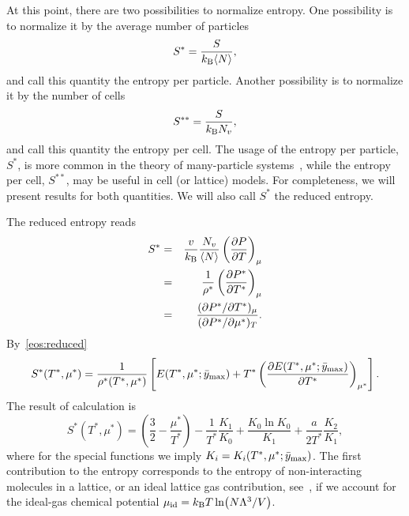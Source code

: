 \documentclass[12pt]{article}
\numberwithin{equation}{section}
\begin{document}
	At this point, there are two possibilities to normalize entropy. One possibility is to normalize it by the average number of particles
	\begin{equation}
		S^{*} = \frac{S}{k_{\rm B} \langle N \rangle},
	\end{equation}
	and call this quantity the entropy per particle. Another possibility is to normalize it by the number of cells
	\begin{equation}
		S^{**} = \frac{S}{k_{\rm B}N_v},
	\end{equation}
	and call this quantity the entropy per cell. The usage of the entropy per particle, $S^*$, is more common in the theory of many-particle systems~\cite{HansenMcDonald13}, while the entropy per cell, $S^{**}$, may be useful in cell (or lattice) models. For completeness, we will present results for both quantities. We will also call $S^*$ the reduced entropy.
	
	
	The reduced entropy reads
	\begin{eqnarray}
		S^* & = & \frac{v}{k_{\rm B}} \frac{N_v}{\langle N \rangle} \left(\frac{\partial P}{\partial T}\right)_{\mu}
		\\
		& = & \frac{1}{\rho^*}\left(\frac{\partial P^*}{\partial T^*}\right)_{\mu}
		\\
		& = & \frac{(\partial P^* / \partial T^*)_{\mu}}{(\partial P^* / \partial \mu^*)_T}.
	\end{eqnarray}
	By~\eqref{eos:reduced}
	\begin{equation}
		\label{eq:entropy}
		S^*(T^*,\mu^*) = \frac{1}{\rho^*(T^*,\mu^*)} 
		\left[ 
		E(T^*,\mu^*;\bar{y}_{\rm max}) + T^* \left(\frac{\partial E(T^*,\mu^*;\bar{y}_{\rm max})}{\partial T^*}\right)_{\mu^*} 
		\right].
	\end{equation}
	The result of calculation is
	\begin{equation}
		\label{S_vs_T_mu}
		S^*(T^*,\mu^*) = \left(\frac{3}{2} - \frac{\mu^*}{T^*}\right) - \frac{1}{T^*}\frac{K_1}{K_0} + \frac{K_0 \ln K_0}{K_1} + \frac{a}{2T^*} \frac{K_2}{K_1},
	\end{equation}
	where for the special functions we imply $K_i = K_i(T^*,\mu^*;\bar{y}_{\rm max})$.
	The first contribution to the entropy corresponds to the entropy of non-interacting molecules in a lattice, or an ideal lattice gas contribution, see~\cite[(47.4)]{Hill56}, if we account for the ideal-gas chemical potential $\mu_{\rm id} = k_{\rm B}T \ln(N\Lambda^3/V)$. 
	
\end{document}
